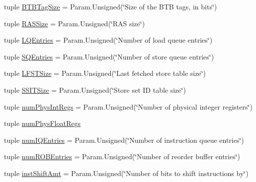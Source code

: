 \begin{DoxyCompactItemize}
\item 
tuple \hyperlink{classSimpleOzoneCPU_1_1SimpleOzoneCPU_ad8cca86a44213bc6d3bd04b3447079d8}{BTBTagSize} = Param.Unsigned(\char`\"{}Size of the BTB tags, in bits\char`\"{})
\item 
tuple \hyperlink{classSimpleOzoneCPU_1_1SimpleOzoneCPU_ad32cfe43a618dca49f7aba3c597df196}{RASSize} = Param.Unsigned(\char`\"{}RAS size\char`\"{})
\item 
tuple \hyperlink{classSimpleOzoneCPU_1_1SimpleOzoneCPU_ae14ed73e842c3580d021c73c0e2b5aaf}{LQEntries} = Param.Unsigned(\char`\"{}Number of load queue entries\char`\"{})
\item 
tuple \hyperlink{classSimpleOzoneCPU_1_1SimpleOzoneCPU_a910857438278a89a287832cf7087317b}{SQEntries} = Param.Unsigned(\char`\"{}Number of store queue entries\char`\"{})
\item 
tuple \hyperlink{classSimpleOzoneCPU_1_1SimpleOzoneCPU_ae8cdf1f1e20a08d0b3200297a9da7d60}{LFSTSize} = Param.Unsigned(\char`\"{}Last fetched store table size\char`\"{})
\item 
tuple \hyperlink{classSimpleOzoneCPU_1_1SimpleOzoneCPU_aaae81435109fd5abd8db9e1cac852536}{SSITSize} = Param.Unsigned(\char`\"{}Store set ID table size\char`\"{})
\item 
tuple \hyperlink{classSimpleOzoneCPU_1_1SimpleOzoneCPU_a4872233fcf1f251c1065c07bf3d288b4}{numPhysIntRegs} = Param.Unsigned(\char`\"{}Number of physical integer registers\char`\"{})
\item 
tuple \hyperlink{classSimpleOzoneCPU_1_1SimpleOzoneCPU_aa014e3ffbc9e5c2cdee9cd256bcb9a94}{numPhysFloatRegs}
\item 
tuple \hyperlink{classSimpleOzoneCPU_1_1SimpleOzoneCPU_a008b4cba2a3f283c5889144437338721}{numIQEntries} = Param.Unsigned(\char`\"{}Number of instruction queue entries\char`\"{})
\item 
tuple \hyperlink{classSimpleOzoneCPU_1_1SimpleOzoneCPU_acb1025bcc322542b7e2fc418cd8d4308}{numROBEntries} = Param.Unsigned(\char`\"{}Number of reorder buffer entries\char`\"{})
\item 
tuple \hyperlink{classSimpleOzoneCPU_1_1SimpleOzoneCPU_a04bfc27685a42245093252b2fab219a5}{instShiftAmt} = Param.Unsigned(\char`\"{}Number of bits to shift instructions by\char`\"{})
\end{DoxyCompactItemize}


